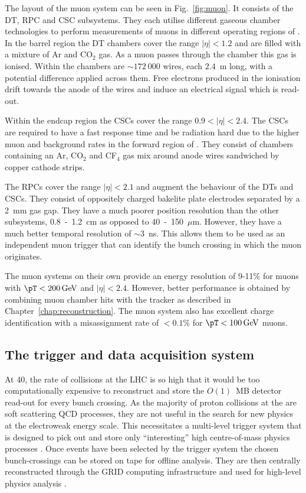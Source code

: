 The layout of the muon system can be seen in Fig.~\ref{fig:muon}. It
consists of the \ac{DT}, \ac{RPC} and \ac{CSC} subsystems. They each
utilise different gaseous chamber technologies to perform measurements
of muons in different operating regions of \CMS. In the barrel region
the \ac{DT} chambers cover the range $|\eta|<1.2$ and are
filled with a mixture of Ar and CO$_2$ gas. As a muon
passes through the chamber this gas is ionised. Within the chambers
are $\sim172~000$ wires, each $2.4$~m long, with a potential difference
applied across them. Free electrons produced in the ionisation drift
towards the anode of the wires and induce an electrical signal which
is read-out. 

Within the endcap region the \ac{CSC}s cover the range
$0.9<|\eta|<2.4$. The \ac{CSC}s are required to have a fast response
time and be radiation hard due to the higher muon and background rates
in the forward region of \CMS. They consist of chambers containing an
Ar, CO$_2$ and CF$_4$ gas mix around anode wires sandwiched by copper
cathode strips.

The \ac{RPC}s cover the range $|\eta|<2.1$ and augment the behaviour
of the \ac{DT}s and \ac{CSC}s. They consist of oppositely charged
bakelite plate electrodes separated by a 2~mm gas gap. They have a
much poorer position resolution than the other subsystems, 0.8~-~1.2~cm
as opposed to 40~-~150~$\mu$m. However, they have a much better temporal
resolution of $\sim3$~ns. This allows them to be used as an
independent muon trigger that can identify the bunch crossing in which
the muon originates.

The muon systems on their own provide an energy resolution of 9-11\%
for muons with $\pT<200\gev$ and $|\eta|<2.4$. However, better
performance is obtained by combining muon chamber hits with the
tracker as described in Chapter~\ref{chap:reconstruction}. The muon
system also has excellent charge identification with a misassignment
rate of $<0.1\%$ for $\pT<100\gev$ muons.

\subsection{The trigger and data acquisition system}
\label{sec:triggers} 

At 40\mhz, the rate of collisions at the LHC is so high that it would
be too computationally expensive to reconstruct and store the
$O(1)$~MB detector read-out for every bunch crossing. As the majority
of proton collisions at the \LHC are soft scattering QCD processes,
they are not useful in the search for new physics at the electroweak
energy scale. This necessitates a multi-level trigger system that is
designed to pick out and store only ``interesting'' high
centre-of-mass physics processes
\cite{Tapper:1556311,Bayatyan:706847}. Once events have been
selected by the trigger system the chosen bunch-crossings can be
stored on tape for offline analysis. They are then centrally
reconstructed through the GRID computing infrastructure and used for
high-level physics analysis \cite{Bayatyan:838359}.

